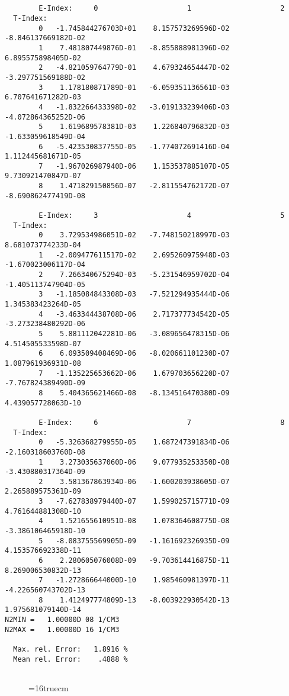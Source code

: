 \documentclass[12pt,dvipdfmx]{article}
\begin{document}
\begin{small}\begin{verbatim}


        E-Index:     0                     1                     2
  T-Index:
        0   -1.745844276703D+01    8.157573269596D-02   -8.846137669182D-02
        1    7.481807449876D-01   -8.855888981396D-02    6.895575898405D-02
        2   -4.821059764779D-01    4.679324654447D-02   -3.297751569188D-02
        3    1.178180871789D-01   -6.059351136561D-03    6.707641671282D-03
        4   -1.832266433398D-02   -3.019133239406D-03   -4.072864365252D-06
        5    1.619689578381D-03    1.226840796832D-03   -1.633059618549D-04
        6   -5.423530837755D-05   -1.774072691416D-04    1.112445681671D-05
        7   -1.967026987940D-06    1.153537885107D-05    9.730921470847D-07
        8    1.471829150856D-07   -2.811554762172D-07   -8.690862477419D-08

        E-Index:     3                     4                     5
  T-Index:
        0    3.729534986051D-02   -7.748150218997D-03    8.681073774233D-04
        1   -2.009477611517D-02    2.695260975948D-03   -1.670023006117D-04
        2    7.266340675294D-03   -5.231546959702D-04   -1.405113747904D-05
        3   -1.185084843308D-03   -7.521294935444D-06    1.345383423264D-05
        4   -3.463344438708D-06    2.717377734542D-05   -3.273238480292D-06
        5    5.881112042281D-06   -3.089656478315D-06    4.514505533598D-07
        6    6.093509408469D-06   -8.020661101230D-07    1.087961936931D-08
        7   -1.135225653662D-06    1.679703656220D-07   -7.767824389490D-09
        8    5.404365621466D-08   -8.134516470380D-09    4.439057728063D-10

        E-Index:     6                     7                     8
  T-Index:
        0   -5.326368279955D-05    1.687247391834D-06   -2.160318603760D-08
        1    3.273035637060D-06    9.077935253350D-08   -3.430880317364D-09
        2    3.581367863934D-06   -1.600203938605D-07    2.265889575361D-09
        3   -7.627838979440D-07    1.599025715771D-09    4.761644881308D-10
        4    1.521655610951D-08    1.078364608775D-08   -3.386106465918D-10
        5   -8.083755569905D-09   -1.161692326935D-09    4.153576692338D-11
        6    2.280605076008D-09   -9.703614416875D-11    8.269006530832D-13
        7   -1.272866644000D-10    1.985460981397D-11   -4.226560743702D-13
        8    1.412497774809D-13   -8.003922930542D-13    1.975681079140D-14
N2MIN =   1.00000D 08 1/CM3
N2MAX =   1.00000D 16 1/CM3

  Max. rel. Error:   1.8916 %
  Mean rel. Error:    .4888 %


\end{verbatim}\end{small}
\begin{figure} \label{2.3.9i}
\epsfxsize=16truecm
\end{figure}
\newpage
\end{document}
